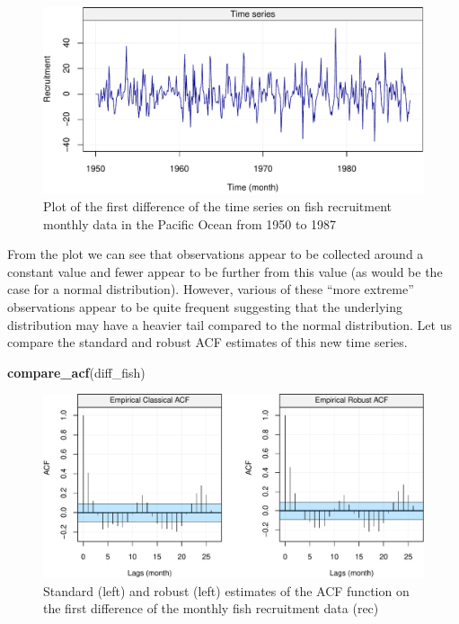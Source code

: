 \documentclass[]{book}
\newenvironment{Shaded}{\begin{snugshade}}{\end{snugshade}}
\newcommand{\KeywordTok}[1]{\textcolor[rgb]{0.13,0.29,0.53}{\textbf{#1}}}
\newcommand{\NormalTok}[1]{#1}
\theoremstyle{definition}
\theoremstyle{definition}
\theoremstyle{definition}
\theoremstyle{remark}
\begin{document}
\begin{figure}

{\centering \includegraphics{ts_files/figure-latex/unnamed-chunk-38-1} 

}

\caption{Plot of the first difference of the time series on fish recruitment monthly data in the Pacific Ocean from 1950 to 1987}\label{fig:unnamed-chunk-38}
\end{figure}

From the plot we can see that observations appear to be collected around
a constant value and fewer appear to be further from this value (as
would be the case for a normal distribution). However, various of these
``more extreme'' observations appear to be quite frequent suggesting
that the underlying distribution may have a heavier tail compared to the
normal distribution. Let us compare the standard and robust ACF
estimates of this new time series.

\begin{Shaded}
\begin{Highlighting}[]
\KeywordTok{compare_acf}\NormalTok{(diff_fish)}
\end{Highlighting}
\end{Shaded}

\begin{figure}

{\centering \includegraphics{ts_files/figure-latex/unnamed-chunk-39-1} 

}

\caption{Standard (left) and robust (left) estimates of the ACF function on the first difference of the monthly fish recruitment data (rec)}\label{fig:unnamed-chunk-39}
\end{figure}
\end{document}

